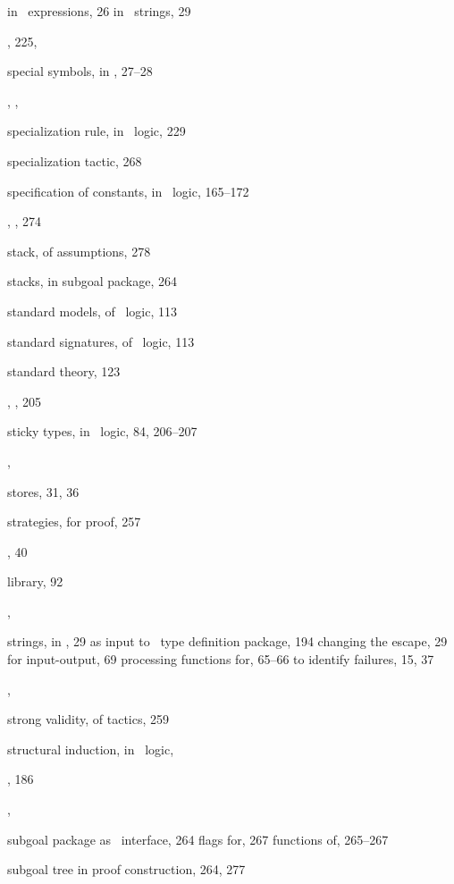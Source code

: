 \begin{theindex}
    \subitem in \ML\ expressions, 26
    \subitem in \ML\ strings, 29
  \item {}, 225, 
  \item special symbols, in \ML, 27--28
  \item {}, , 
  \item specialization rule, in \HOL\ logic, 229
  \item specialization tactic, 268
  \item specification of constants, in \HOL\ logic, 165--172
  \item {}, , 274
  \item stack, of assumptions, 278
  \item stacks, in subgoal package, 264
  \item standard models, of \HOL\ logic, 113
  \item standard signatures, of \HOL\ logic, 113
  \item standard theory, 123
  \item {}, , 205
  \item sticky types, in \HOL\ logic, 84, 206--207
  \item {}, 
  \item stores, 31, 36
  \item strategies, for proof, 257
  \item {}, 40
  \item {} library, 92
  \item {}, 
  \item strings, in \ML, 29
    \subitem as input to \HOL\ type definition package, 194
    \subitem changing the escape, 29
    \subitem for input-output, 69
    \subitem processing functions for, 65--66
    \subitem to identify failures, 15, 37
  \item {}, 
  \item strong validity, of tactics, 259
  \item structural induction, in \HOL\ logic, 
  \item {}, 186
  \item {}, 
  \item subgoal package
    \subitem as \HOL\ interface, 264
    \subitem flags for, 267
    \subitem functions of, 265--267
  \item subgoal tree
    \subitem in proof construction, 264, 277

\end{theindex}
